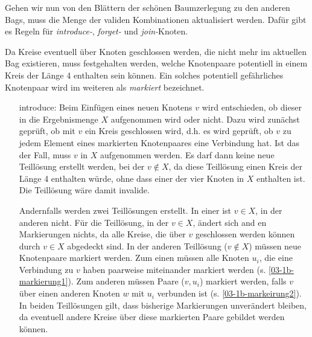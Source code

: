 Gehen wir nun von den Blättern der schönen Baumzerlegung zu den anderen Bags, muss die Menge der validen Kombinationen aktualisiert werden. Dafür gibt es Regeln für \textit{introduce-}, \textit{forget-} und \textit{join-}Knoten. 

Da Kreise eventuell über Knoten geschlossen werden, die nicht mehr im aktuellen Bag existieren, muss festgehalten werden, welche Knotenpaare potentiell in einem Kreis der Länge 4 enthalten sein können. Ein solches potentiell gefährliches Knotenpaar wird im weiteren als \textit{markiert} bezeichnet.

\begin{itemize}
\item[introduce: ]Beim Einfügen eines neuen Knotens $v$ wird entschieden, ob dieser in die Ergebnismenge $X$ aufgenommen wird oder nicht. Dazu wird zunächst geprüft, ob mit $v$ ein Kreis geschlossen wird, d.h. es wird geprüft, ob $v$ zu jedem Element eines markierten Knotenpaares eine Verbindung hat. Ist das der Fall, muss $v$ in $X$ aufgenommen werden. Es darf dann keine neue Teillösung erstellt werden, bei der $v\notin X$, da diese Teillösung einen Kreis der Länge 4 enthalten würde, ohne dass einer der vier Knoten in $X$ enthalten ist. Die Teillösung wäre damit invalide.

Andernfalls werden zwei Teillösungen erstellt. In einer ist $v\in X$, in der anderen nicht. Für die Teillösung, in der $v\in X$, ändert sich and en Markierungen nichts, da alle Kreise, die über $v$ geschlossen werden können durch $v\in X$ abgedeckt sind. In der anderen Teillösung ($v\notin X$) müssen neue Knotenpaare markiert werden. Zum einen müssen alle Knoten $u_i$, die eine Verbindung zu $v$ haben paarweise miteinander markiert werden (s. \autoref{03-1b-markierung1}). Zum anderen müssen Paare ($v,u_i$) markiert werden, falls $v$ über einen anderen Knoten $w$ mit $u_i$ verbunden ist (s. \autoref{03-1b-markeirung2}). In beiden Teillösungen gilt, dass bisherige Markierungen unverändert bleiben, da eventuell andere Kreise über diese markierten Paare gebildet werden können.


\end{itemize}
